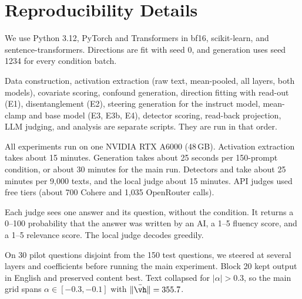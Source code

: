 \section{Reproducibility Details}
\label{app:details}

 We use Python 3.12, PyTorch and Transformers in bf16, scikit-learn, and sentence-transformers. Directions are fit with seed 0, and generation uses seed 1234 for every condition batch.

 Data construction, activation extraction (raw text, mean-pooled, all layers, both models), covariate scoring, confound generation, direction fitting with read-out (E1), disentanglement (E2), steering generation for the instruct model, mean-clamp and base model (E3, E3b, E4), detector scoring, read-back projection, LLM judging, and analysis are separate scripts. They are run in that order.

 All experiments run on one NVIDIA RTX A6000 (48\,GB). Activation extraction takes about 15 minutes. Generation takes about 25 seconds per 150-prompt condition, or about 30 minutes for the main run. Detectors and \binoculars take about 25 minutes per 9,000 texts, and the local judge about 15 minutes. API judges used free tiers (about 700 Cohere and 1,035 OpenRouter calls).

 Each judge sees one answer and its question, without the condition. It returns a 0--100 probability that the answer was written by an AI, a 1--5 fluency score, and a 1--5 relevance score. The local judge decodes greedily.

 On 30 pilot questions disjoint from the 150 test questions, we steered at several layers and coefficients before running the main experiment. Block 20 kept output in English and preserved content best. Text collapsed for $|\alpha|>0.3$, so the main grid spans $\alpha\in[-0.3,-0.1]$ with $\|\bar\vh\|=355.7$.
